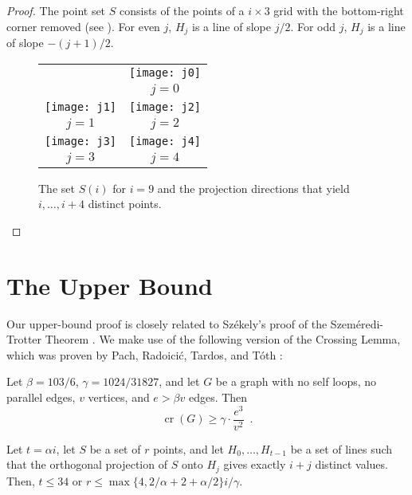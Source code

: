\documentclass{patmorin}
\DeclareMathOperator{\cn}{cr}
\begin{document}
\begin{proof}
The point set $S$ consists of the points of a $i\times 3$ grid with the bottom-right corner removed (see ).  For even $j$, $H_j$ is a line of slope $j/2$.  For odd $j$, $H_j$ is a line of slope $-(j+1)/2$.
\begin{figure}
  \begin{center} 
    \begin{tabular}{cc}
      & \texttt{[image: j0]} \\ 
      & $j = 0$  \\
       \texttt{[image: j1]} & \texttt{[image: j2]} \\
        $j=1$ & $j=2$ \\
       \texttt{[image: j3]} & \texttt{[image: j4]} \\
        $j=3$ & $j=4$
    \end{tabular}
  \end{center}
  \caption{The set $S(i)$  for $i=9$ and the projection directions that yield $i,\ldots,i+4$ distinct points.}
\end{figure}
\end{proof}


\section{The Upper Bound}

Our upper-bound proof is closely related to Sz\'ekely's proof of the
Szem\'eredi-Trotter Theorem \cite{s97}.  We make use of the following
version of the Crossing Lemma, which was proven by Pach, Radoici\'c,
Tardos, and T\'oth \cite{prtt04}:

\begin{lem}\label{lem:crossing}
Let
$\beta=103/6$, $\gamma = 1024/31827$, and let
$G$ be a graph with no self loops, no parallel edges, $v$ vertices, and
$e > \beta v$ edges.  Then
\[
  \cn(G) \ge \gamma \cdot \frac{e^3}{v^2} \enspace .
\]
\end{lem}


\begin{lem}
Let $t=\alpha i$, let $S$ be a set of $r$ points, and let
$H_0,\ldots,H_{t-1}$ be a set of lines such that the orthogonal projection
of $S$ onto $H_{j}$ gives exactly $i+j$ distinct values.  Then, $t\le 34$
or $r\le \max\{4,2/\alpha + 2 + \alpha/2\}i/\gamma$.
\end{lem}
\end{document}
